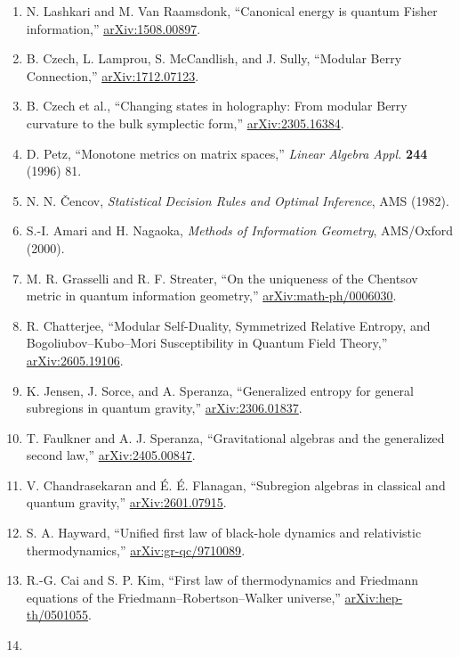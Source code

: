 \documentclass[
  11pt,
  letterpaper,
]{article}
\begin{document}
\begin{enumerate}
\item
  N. Lashkari and M. Van Raamsdonk, ``Canonical energy is quantum Fisher
  information,''
  \href{https://arxiv.org/abs/1508.00897}{arXiv:1508.00897}.
\item
  B. Czech, L. Lamprou, S. McCandlish, and J. Sully, ``Modular Berry
  Connection,''
  \href{https://arxiv.org/abs/1712.07123}{arXiv:1712.07123}.
\item
  B. Czech et al., ``Changing states in holography: From modular Berry
  curvature to the bulk symplectic form,''
  \href{https://arxiv.org/abs/2305.16384}{arXiv:2305.16384}.
\item
  D. Petz, ``Monotone metrics on matrix spaces,'' \emph{Linear Algebra
  Appl.} \textbf{244} (1996) 81.
\item
  N. N. Čencov, \emph{Statistical Decision Rules and Optimal Inference},
  AMS (1982).
\item
  S.-I. Amari and H. Nagaoka, \emph{Methods of Information Geometry},
  AMS/Oxford (2000).
\item
  M. R. Grasselli and R. F. Streater, ``On the uniqueness of the
  Chentsov metric in quantum information geometry,''
  \href{https://arxiv.org/abs/math-ph/0006030}{arXiv:math-ph/0006030}.
\item
  R. Chatterjee, ``Modular Self-Duality, Symmetrized Relative Entropy,
  and Bogoliubov--Kubo--Mori Susceptibility in Quantum Field Theory,''
  \href{https://arxiv.org/abs/2605.19106}{arXiv:2605.19106}.
\item
  K. Jensen, J. Sorce, and A. Speranza, ``Generalized entropy for
  general subregions in quantum gravity,''
  \href{https://arxiv.org/abs/2306.01837}{arXiv:2306.01837}.
\item
  T. Faulkner and A. J. Speranza, ``Gravitational algebras and the
  generalized second law,''
  \href{https://arxiv.org/abs/2405.00847}{arXiv:2405.00847}.
\item
  V. Chandrasekaran and É. É. Flanagan, ``Subregion algebras in
  classical and quantum gravity,''
  \href{https://arxiv.org/abs/2601.07915}{arXiv:2601.07915}.
\item
  S. A. Hayward, ``Unified first law of black-hole dynamics and
  relativistic thermodynamics,''
  \href{https://arxiv.org/abs/gr-qc/9710089}{arXiv:gr-qc/9710089}.
\item
  R.-G. Cai and S. P. Kim, ``First law of thermodynamics and Friedmann
  equations of the Friedmann--Robertson--Walker universe,''
  \href{https://arxiv.org/abs/hep-th/0501055}{arXiv:hep-th/0501055}.
\item

\end{enumerate}
\end{document}
